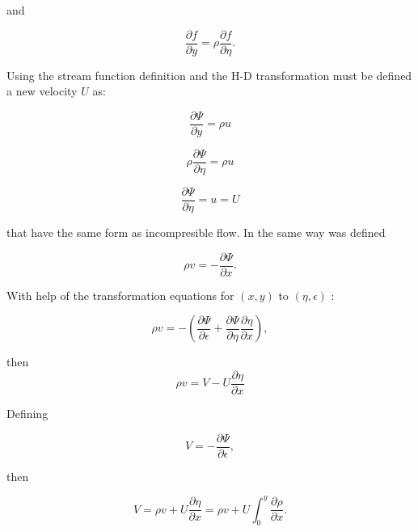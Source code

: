 and 

\begin{equation}
\frac{\partial f}{\partial y}
=
\rho
\frac{\partial f}{\partial \eta}
.
\end{equation} 

Using the stream function definition and the 
H-D transformation  must be defined a new velocity $U$ as:

\begin{equation}
\frac{\partial \Psi}{\partial y}
=
\rho u
\end{equation} 

\begin{equation}
\rho
\frac{\partial \Psi}{\partial \eta}
=
\rho
u
\end{equation} 

\begin{equation}
\frac{\partial \Psi}{\partial \eta}
=
u
=
U
\end{equation} 

that have the same form as incompresible flow. 
In the same way was defined

\begin{equation}
\rho v=-\frac{\partial \Psi}{\partial x}.
\end{equation} 

With  help of the transformation equations for  $(x,y)$  to 
$(\eta,\epsilon)$ : 

\begin{equation}
  \rho v=
  -
  \left(
       \frac{\partial \Psi}{\partial \epsilon}+
       \frac{\partial \Psi}{\partial \eta}
       \frac{\partial \eta}{\partial x}
  \right),
\end{equation} 

then 
\begin{equation}
  \rho v=
       V
       -
       U
       \frac{\partial \eta}{\partial x}
\end{equation} 

Defining 

\begin{equation}
       V=-\frac{\partial \Psi}{\partial \epsilon}
       ,
\end{equation} 

then 

\begin{equation}
    V
    =
    \rho v
    +
    U
    \frac{\partial \eta}{\partial x}
    =
    \rho v
    +
    U
    \int_0^y
    \frac{\partial \rho}{\partial x}
    .
\end{equation} 

